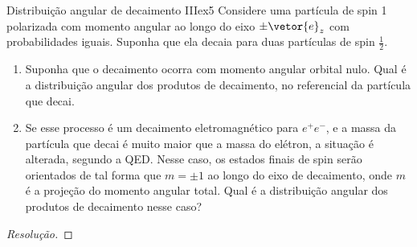\begin{exercício}{Distribuição angular de decaimento III}{ex5}
   Considere uma partícula de spin 1 polarizada com momento angular ao longo do eixo \(\pm \vetor{e}_z\) com probabilidades iguais. Suponha que ela decaia para duas partículas de spin \(\frac12.\)
   \begin{enumerate}[label=(\alph*)]
       \item Suponha que o decaimento ocorra com momento angular orbital nulo. Qual é a distribuição angular dos produtos de decaimento, no referencial da partícula que decai.
       \item Se esse processo é um decaimento eletromagnético para \(e^+ e^-\), e a massa da partícula que decai é muito maior que a massa do elétron, a situação é alterada, segundo a QED. Nesse caso, os estados finais de spin serão orientados de tal forma que \(m = \pm 1\) ao longo do eixo de decaimento, onde \(m\) é a projeção do momento angular total. Qual é a distribuição angular dos produtos de decaimento nesse caso?
   \end{enumerate}
\end{exercício}
\begin{proof}[Resolução]
    
\end{proof}

